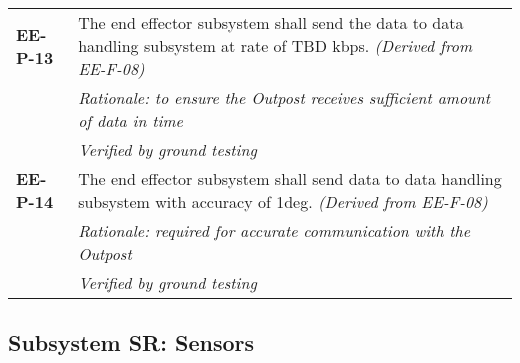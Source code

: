 \begin{longtable}{P{2cm}P{13.25cm}}
\textbf{EE-P-13}	& The end effector subsystem shall send the data to data handling subsystem at rate of \gls{TBD} \gls{kbps}. 
\textit{(Derived from EE-F-08)} \\
 & \textit{Rationale: to ensure the Outpost receives sufficient amount of data in time} \\
  & \textit{Verified by ground testing}				\\

\textbf{EE-P-14}	& The end effector subsystem shall send data to data handling subsystem with accuracy of 1\gls{deg}. 
\textit{(Derived from EE-F-08)} \\
& \textit{Rationale: required for accurate communication with the Outpost} \\
& \textit{Verified by ground testing}	
\end{longtable}

\subsection{Subsystem SR: Sensors}
\label{sect:SR_req}
